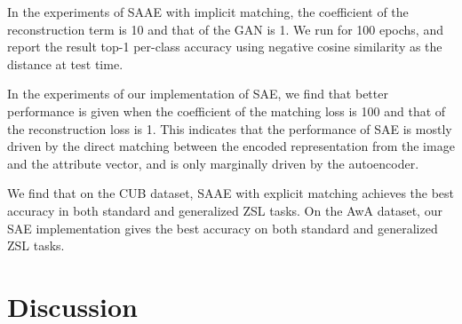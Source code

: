 \documentclass{article}
\begin{document}
In the experiments of SAAE with implicit matching, the coefficient of the reconstruction term is 10 and that of the GAN is 1. We run for 100 epochs, and report the result top-1 per-class accuracy using negative cosine similarity as the distance at test time.

In the experiments of our implementation of SAE, we find that better performance is given when the coefficient of the matching loss is 100 and that of the reconstruction loss is 1. This indicates that the performance of SAE is mostly driven by the direct matching between the encoded representation from the image and the attribute vector, and is only marginally driven by the autoencoder.


We find that on the CUB dataset, SAAE with explicit matching achieves the best accuracy in both standard and generalized ZSL tasks. On the AwA dataset, our SAE implementation gives the best accuracy on both standard and generalized ZSL tasks.




\section{Discussion}




\end{document}
